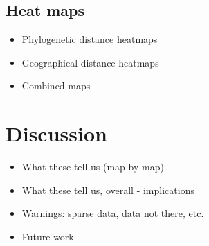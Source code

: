 \documentclass[11pt]{article}
\begin{document}
\subsection{Heat maps}
\begin{itemize}
\item Phylogenetic distance heatmaps
\item Geographical distance heatmaps
\item Combined maps
\end{itemize}


\section{Discussion}
\begin{itemize}
\item What these tell us (map by map)
\item What these tell us, overall - implications
\item Warnings: sparse data, data not there, etc. 
\item Future work 
%
\end{itemize}



\end{document}
